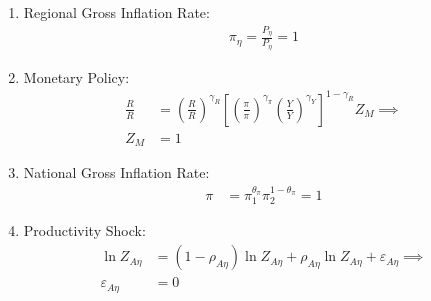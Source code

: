 \documentclass[../thesis.tex]{subfiles}
\begin{document}
\begin{enumerate}
	\item Regional Gross Inflation Rate:
	\begin{align}
		\pi_{\eta} = \frac{P_{\eta}}{P_{\eta}} = 1 \label{eq_v2:reg-ss-regional-inflation}
	\end{align}
	
	\begin{comment}
			\item Intermediate-goods Firms Profit:
		\begin{align}
			\Pi_{\eta} &= \int_{0}^{1} P_{\eta} Y_{\eta j} - W_{\eta} L_{\eta j} \dif j \label{eq_v2:reg-ss-int-good-firm-profit-total-2}
		\end{align}
		
	\end{comment}
	
	\item Monetary Policy:
	\begin{align}
		\frac{R_{}}{R_{}} &= \left( \frac{R_{}}{R_{}} \right)^{\gamma_{R}} \left[ \left( \frac{\pi_{}}{\pi_{}} \right)^{\gamma_{\pi}} \left( \frac{Y_{}}{Y_{}} \right)^{\gamma_{Y}} \right]^{1-\gamma_{R}} Z_{M} \implies \nonumber \\
		Z_{M} &= 1 \label{eq_v2:reg-ss-monetary-policy}
	\end{align}
	
	\item National Gross Inflation Rate:
	\begin{align}
		\pi_{} &= \pi_{1}^{\theta_{\pi}} \pi_{2}^{1 - \theta_{\pi}} = 1 \label{eq_v2:reg-ss-gross-inflation-rate}
	\end{align}
	
	\begin{comment}
		\item National Price Level:
		\begin{align}
			P_{} &= \frac{P_{1} Y_{1} + P_{2} Y_{2}}{Y_{}} \label{eq_v2:reg-ss-national-price-level} %
		\end{align}	
	\end{comment}
	
	\item Productivity Shock:
	\begin{align}
		\ln{Z_{A\eta}} &= (1-\rho_{A\eta}) \ln{Z_{A\eta}} + \rho_{A\eta} \ln{Z_{A\eta}} + \varepsilon_{A\eta} \implies \nonumber \\
		\varepsilon_{A\eta} &= 0 \label{eq_v2:reg-ss-productivity-shock}
	\end{align}
	

\end{enumerate}
\end{document}
